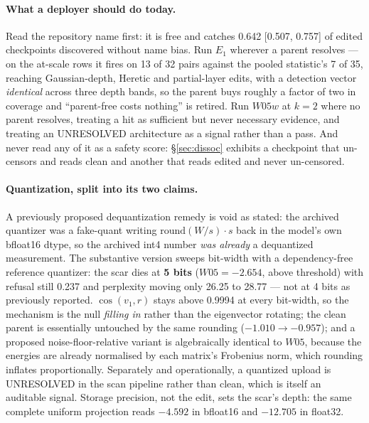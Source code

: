 \documentclass[11pt,letterpaper]{article}
\begin{document}
\paragraph{What a deployer should do today.} Read the repository name first: it is free and catches 0.642 [0.507, 0.757] of edited checkpoints discovered without name bias. Run $E_1$ wherever a parent resolves --- on the at-scale rows it fires on 13 of 32 pairs against the pooled statistic's 7 of 35, reaching Gaussian-depth, Heretic and partial-layer edits, with a detection vector \emph{identical} across three depth bands, so the parent buys roughly a factor of two in coverage and ``parent-free costs nothing'' is retired. Run $W05w$ at $k = 2$ where no parent resolves, treating a hit as sufficient but never necessary evidence, and treating an UNRESOLVED architecture as a signal rather than a pass. And never read any of it as a safety score: \S\ref{sec:dissoc} exhibits a checkpoint that un-censors and reads clean and another that reads edited and never un-censored.

\paragraph{Quantization, split into its two claims.} A previously proposed dequantization remedy is void as stated: the archived quantizer was a fake-quant writing $\mathrm{round}(W/s)\cdot s$ back in the model's own bfloat16 dtype, so the archived int4 number \emph{was already} a dequantized measurement. The substantive version sweeps bit-width with a dependency-free reference quantizer: the scar dies at \textbf{5 bits} ($W05 = -2.654$, above threshold) with refusal still 0.237 and perplexity moving only 26.25 to 28.77 --- not at 4 bits as previously reported. $\cos(v_1,r)$ stays above 0.9994 at every bit-width, so the mechanism is the null \emph{filling in} rather than the eigenvector rotating; the clean parent is essentially untouched by the same rounding ($-1.010 \to -0.957$); and a proposed noise-floor-relative variant is algebraically identical to $W05$, because the energies are already normalised by each matrix's Frobenius norm, which rounding inflates proportionally. Separately and operationally, a quantized upload is UNRESOLVED in the scan pipeline rather than clean, which is itself an auditable signal. Storage precision, not the edit, sets the scar's depth: the same complete uniform projection reads $-4.592$ in bfloat16 and $-12.705$ in float32.
\end{document}
